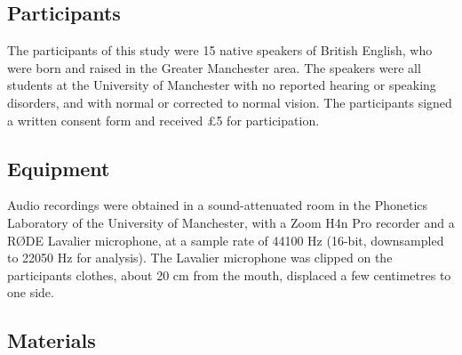 \documentclass[12pt,a4paper,]{article}
\begin{document}
\hypertarget{participants}{%
\subsection{Participants}\label{participants}}

The participants of this study were 15 native speakers of British
English, who were born and raised in the Greater Manchester area. The
speakers were all students at the University of Manchester with no
reported hearing or speaking disorders, and with normal or corrected to
normal vision. The participants signed a written consent form and
received £5 for participation.

\hypertarget{equipment}{%
\subsection{Equipment}\label{equipment}}

Audio recordings were obtained in a sound-attenuated room in the
Phonetics Laboratory of the University of Manchester, with a Zoom H4n
Pro recorder and a RØDE Lavalier microphone, at a sample rate of 44100
Hz (16-bit, downsampled to 22050 Hz for analysis). The Lavalier
microphone was clipped on the participants clothes, about 20 cm from the
mouth, displaced a few centimetres to one side.

\hypertarget{materials}{%
\subsection{Materials}\label{materials}}

\end{document}
